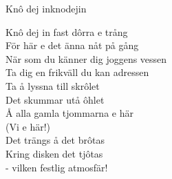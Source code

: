 \begin{song}{Knô dej in}{knodejin}
\begin{vers}
Knô dej in fast dôrra e trång\\
För här e det änna nåt på gång\\
När som du känner dig joggens vessen\\
Ta dig en frikväll du kan adressen\\
Ta å lyssna till skrôlet\\
Det skummar utå ôhlet\\
Å alla gamla tjommarna e här\\
(Vi e här!)\\
Det trängs å det brôtas\\
Kring disken det tjôtas\\
- vilken festlig atmosfär!\\
\end{vers}
\end{song}
